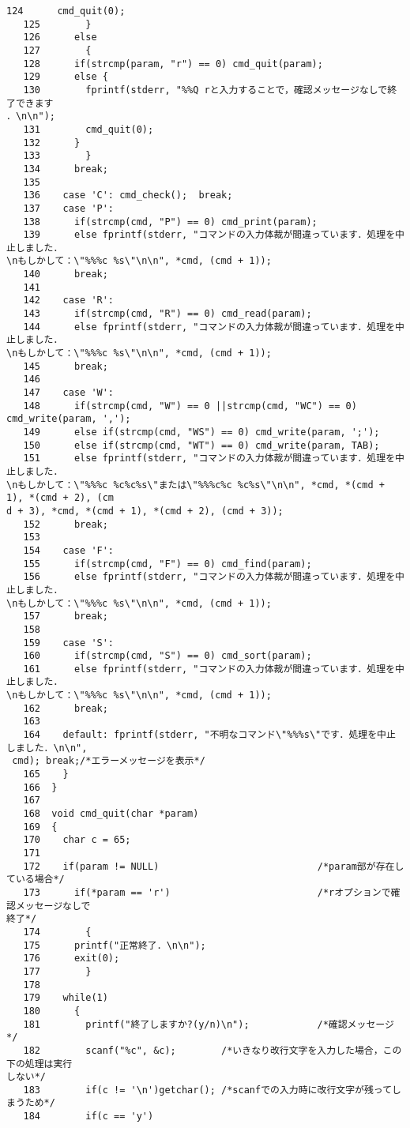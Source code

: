 \begin{Verbatim}[fontsize=\small, baselinestretch=0.8]
   124		cmd_quit(0);
   125	      }
   126	    else
   127	      {
   128		if(strcmp(param, "r") == 0) cmd_quit(param);
   129		else {
   130		  fprintf(stderr, "%%Q rと入力することで，確認メッセージなしで終了できます
．\n\n");
   131		  cmd_quit(0);
   132		}
   133	      }
   134	    break;
   135	
   136	  case 'C': cmd_check();  break;
   137	  case 'P':
   138	    if(strcmp(cmd, "P") == 0) cmd_print(param);
   139	    else fprintf(stderr, "コマンドの入力体裁が間違っています．処理を中止しました．
\nもしかして：\"%%%c %s\"\n\n", *cmd, (cmd + 1));
   140	    break;
   141	
   142	  case 'R':
   143	    if(strcmp(cmd, "R") == 0) cmd_read(param);
   144	    else fprintf(stderr, "コマンドの入力体裁が間違っています．処理を中止しました．
\nもしかして：\"%%%c %s\"\n\n", *cmd, (cmd + 1));
   145	    break;
   146	
   147	  case 'W':
   148	    if(strcmp(cmd, "W") == 0 ||strcmp(cmd, "WC") == 0) cmd_write(param, ',');
   149	    else if(strcmp(cmd, "WS") == 0) cmd_write(param, ';');
   150	    else if(strcmp(cmd, "WT") == 0) cmd_write(param, TAB);
   151	    else fprintf(stderr, "コマンドの入力体裁が間違っています．処理を中止しました．
\nもしかして：\"%%%c %c%c%s\"または\"%%%c%c %c%s\"\n\n", *cmd, *(cmd + 1), *(cmd + 2), (cm
d + 3), *cmd, *(cmd + 1), *(cmd + 2), (cmd + 3));
   152	    break;
   153	
   154	  case 'F':
   155	    if(strcmp(cmd, "F") == 0) cmd_find(param);
   156	    else fprintf(stderr, "コマンドの入力体裁が間違っています．処理を中止しました．
\nもしかして：\"%%%c %s\"\n\n", *cmd, (cmd + 1));
   157	    break;
   158	
   159	  case 'S':
   160	    if(strcmp(cmd, "S") == 0) cmd_sort(param);
   161	    else fprintf(stderr, "コマンドの入力体裁が間違っています．処理を中止しました．
\nもしかして：\"%%%c %s\"\n\n", *cmd, (cmd + 1));
   162	    break;
   163	
   164	  default: fprintf(stderr, "不明なコマンド\"%%%s\"です．処理を中止しました．\n\n",
 cmd); break;/*エラーメッセージを表示*/
   165	  }
   166	}
   167	
   168	void cmd_quit(char *param)
   169	{
   170	  char c = 65;
   171	
   172	  if(param != NULL)                            /*param部が存在している場合*/
   173	    if(*param == 'r')                          /*rオプションで確認メッセージなしで
終了*/
   174	      {
   175		printf("正常終了．\n\n");
   176		exit(0);
   177	      }
   178	 
   179	  while(1)
   180	    {
   181	      printf("終了しますか?(y/n)\n");            /*確認メッセージ*/
   182	      scanf("%c", &c);        /*いきなり改行文字を入力した場合，この下の処理は実行
しない*/
   183	      if(c != '\n')getchar(); /*scanfでの入力時に改行文字が残ってしまうため*/
   184	      if(c == 'y')

\end{Verbatim}

